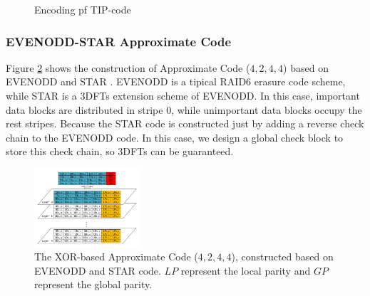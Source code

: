 \documentclass[sigconf]{acmart}
\begin{document}
\begin{figure}[h]
\caption{Encoding pf TIP-code}
\label{fig-TIP}
\end{figure}

\subsubsection{EVENODD-STAR Approximate Code}
Figure \ref{fig-ap-STAR} shows the construction of Approximate Code ($4,2,4,4$) based on EVENODD \cite{blaum1995evenodd} and STAR \cite{huang2008star}. 
EVENODD is a tipical RAID6 erasure code scheme, while STAR is a 3DFTs extension scheme of EVENODD. In this case, important data blocks are distributed in stripe 0, while unimportant data blocks occupy the rest stripes. 
Because the STAR code is constructed just by adding a reverse check chain to the EVENODD code. In this case, we design a global check block to store this check chain, so 3DFTs can be guaranteed.

\begin{figure}[h]
\centering
\includegraphics[width=0.35\textwidth]{photo/AP-EVEN-star-v2.pdf}
\caption{The XOR-based Approximate Code ($4,2,4,4$), constructed based on EVENODD and STAR code. $LP$ represent the local parity and $GP$ represent the global parity.}
\label{fig-ap-STAR}
\end{figure}
\end{document}
